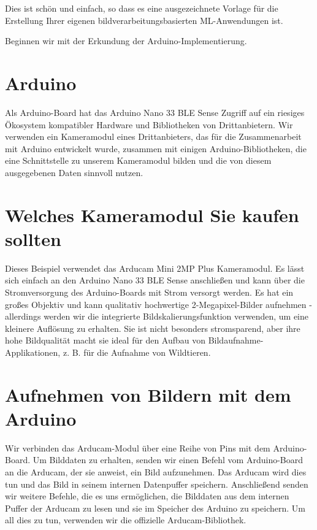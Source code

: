 Dies ist schön und einfach, so dass es eine ausgezeichnete Vorlage für die Erstellung Ihrer eigenen bildverarbeitungsbasierten ML-Anwendungen ist.

Beginnen wir mit der Erkundung der Arduino-Implementierung.


\section{Arduino}

Als Arduino-Board hat das Arduino Nano 33 BLE Sense Zugriff auf ein riesiges Ökosystem kompatibler Hardware und Bibliotheken von Drittanbietern. Wir verwenden ein Kameramodul eines Drittanbieters, das für die Zusammenarbeit mit Arduino entwickelt wurde, zusammen mit einigen Arduino-Bibliotheken, die eine Schnittstelle zu unserem Kameramodul bilden und die von diesem ausgegebenen Daten sinnvoll nutzen.

\section{Welches Kameramodul Sie kaufen sollten}

Dieses Beispiel verwendet das Arducam Mini 2MP Plus Kameramodul. Es lässt sich einfach an den Arduino Nano 33 BLE Sense anschließen und kann über die Stromversorgung des Arduino-Boards mit Strom versorgt werden. Es hat ein großes Objektiv und kann qualitativ hochwertige 2-Megapixel-Bilder aufnehmen - allerdings werden wir die integrierte Bildskalierungsfunktion verwenden, um eine kleinere Auflösung zu erhalten. Sie ist nicht besonders stromsparend, aber ihre hohe Bildqualität macht sie ideal für den Aufbau von Bildaufnahme-Applikationen, z. B. für die Aufnahme von Wildtieren.

\section{Aufnehmen von Bildern mit dem Arduino}

Wir verbinden das Arducam-Modul über eine Reihe von Pins mit dem Arduino-Board. Um Bilddaten zu erhalten, senden wir einen Befehl vom Arduino-Board an die Arducam, der sie anweist, ein Bild aufzunehmen. Das Arducam wird dies tun und das Bild in seinem internen Datenpuffer speichern. Anschließend senden wir weitere Befehle, die es uns ermöglichen, die Bilddaten aus dem internen Puffer der Arducam zu lesen und sie im Speicher des Arduino zu speichern. Um all dies zu tun, verwenden wir die offizielle Arducam-Bibliothek.

